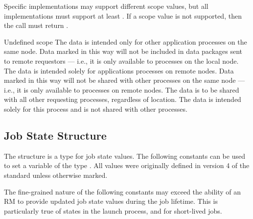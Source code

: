 Specific implementations may support different scope values, but all implementations must support at least .
If a scope value is not supported, then the  call must return .

\begin{constantdesc}
%
Undefined scope
%
The data is intended only for other application processes on the same node.
Data marked in this way will not be included in data packages sent to remote requestors --- i.e., it is only available to processes on the local node.
%
The data is intended solely for applications processes on remote nodes.
Data marked in this way will not be shared with other processes on the same node --- i.e., it is only available to  processes on remote nodes.
%
The data is to be shared with all other requesting processes, regardless of location.
%
The data is intended solely for this process and is not shared with other processes.
%
\end{constantdesc}


\subsection{Job State Structure}
\label{api:struct:jobstate}

The  structure is a  type for job state values. The following constants can be used to set a variable of the type . All values were originally defined in version 4 of the standard unless otherwise marked.

\adviceuserstart
The fine-grained nature of the following constants may exceed the ability of an \ac{RM} to provide updated job state values during the job lifetime. This is particularly true of states in the launch process, and for short-lived jobs.
\adviceuserend

